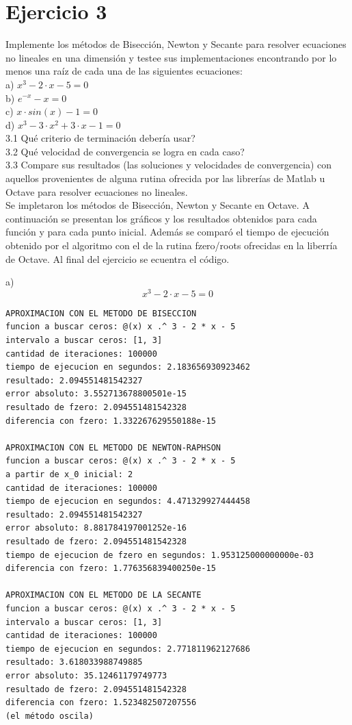 \documentclass{article}
\begin{document}
\section{Ejercicio 3}
Implemente los métodos de Bisección, Newton y Secante para resolver
ecuaciones no lineales en una dimensión y testee sus implementaciones encontrando por lo
menos una raíz de cada una de las siguientes ecuaciones:\\
a) $x^{3} - 2 \cdot x - 5 = 0$ \\
b) $e^{-x} - x = 0$ \\
c) $x \cdot sin(x) -1 = 0$ \\
d) $x^{3} - 3 \cdot x^{2} + 3 \cdot x - 1 = 0$ \\
3.1 Qué criterio de terminación debería usar?\\
3.2 Qué velocidad de convergencia se logra en cada caso?\\
3.3 Compare sus resultados (las soluciones y velocidades de convergencia) con aquellos
provenientes de alguna rutina ofrecida por las librerías de Matlab u Octave para resolver
ecuaciones no lineales.\\

Se impletaron los métodos de Bisección, Newton y Secante en Octave. A continuación se presentan los gráficos y los resultados obtenidos para cada función y para cada punto inicial. Además se comparó el tiempo de ejecución obtenido por el algoritmo con el de la rutina fzero/roots ofrecidas en la liberría de Octave. Al final del ejercicio se ecuentra el código. \\

\vspace{4cm}

a)
\[ x^{3} - 2 \cdot x - 5 = 0\]

\begin{lstlisting}
APROXIMACION CON EL METODO DE BISECCION
funcion a buscar ceros: @(x) x .^ 3 - 2 * x - 5
intervalo a buscar ceros: [1, 3]
cantidad de iteraciones: 100000
tiempo de ejecucion en segundos: 2.183656930923462
resultado: 2.094551481542327
error absoluto: 3.552713678800501e-15
resultado de fzero: 2.094551481542328
diferencia con fzero: 1.332267629550188e-15

APROXIMACION CON EL METODO DE NEWTON-RAPHSON
funcion a buscar ceros: @(x) x .^ 3 - 2 * x - 5
a partir de x_0 inicial: 2
cantidad de iteraciones: 100000
tiempo de ejecucion en segundos: 4.471329927444458
resultado: 2.094551481542327
error absoluto: 8.881784197001252e-16
resultado de fzero: 2.094551481542328
tiempo de ejecucion de fzero en segundos: 1.953125000000000e-03
diferencia con fzero: 1.776356839400250e-15

APROXIMACION CON EL METODO DE LA SECANTE
funcion a buscar ceros: @(x) x .^ 3 - 2 * x - 5
intervalo a buscar ceros: [1, 3]
cantidad de iteraciones: 100000
tiempo de ejecucion en segundos: 2.771811962127686
resultado: 3.618033988749885
error absoluto: 35.12461179749773
resultado de fzero: 2.094551481542328
diferencia con fzero: 1.523482507207556
(el método oscila)
\end{lstlisting}
\end{document}
